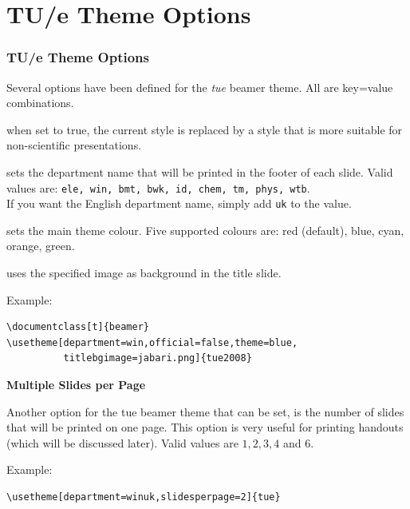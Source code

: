 \documentclass[t]{beamer}
\newenvironment{descrsf}[1]
  {\begin{list}{}{\renewcommand{\makelabel}[1]{\textsf{##1}\hfil}
                  \setlength{\itemsep}{0.5em}
                  \setlength{\parsep}{0pt}
                  \settowidth{\labelwidth}{\textsf{#1}}
                  \setlength{\labelsep}{10pt}
                  \setlength{\leftmargin}{\labelwidth}
                  \addtolength{\leftmargin}{\labelsep}
                  \providecommand{\descriptionlabel}[1]%
                      {\hspace{\labelsep}\textsf{#1}}
                 }
  }
  {\end{list}}
\begin{document}
\section{TU/e Theme Options}
\begin{frame}[fragile]
\frametitle{TU/e Theme Options}

Several options have been defined for the {\em tue} beamer theme. All are \textsf{key=value} combinations.

\begin{descrsf}{titlebgimage}
\item[official] when set to true, the current style is replaced by a style that is more suitable for non-scientific presentations.
\item[department] sets the department name that will be printed in the footer of each slide. Valid values are:
{\tt ele, win, bmt, bwk, id, chem, tm, phys, wtb}. \\If you want the English department name, simply add {\tt uk} to the value.
\item[theme] sets the main theme colour. Five supported colours are: red (default), blue, cyan, orange, green.
\item[titlebgimage] uses the specified image as background in the title slide.
\end{descrsf}
\end{frame}

\begin{frame}[fragile]
Example:

\begin{lstlisting}
\documentclass[t]{beamer}
\usetheme[department=win,official=false,theme=blue,
          titlebgimage=jabari.png]{tue2008}
\end{lstlisting}

\bigskip
{\large\textbf{\color{tuecyan}Multiple Slides per Page}}

\bigskip
Another option for the {\sf tue} beamer theme that can be set, is the number of slides that will be printed on one page. This option is very useful for printing handouts (which will be discussed later). Valid values are $1, 2, 3, 4$ and $6$.

Example:
\begin{lstlisting}
\usetheme[department=winuk,slidesperpage=2]{tue}
\end{lstlisting}
\end{frame}
\end{document}
